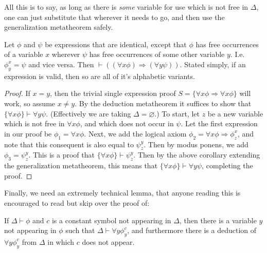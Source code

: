 All this is to say, as long as there is \textit{some} variable for use which is not free in $\Delta$, one can just substitute that wherever it needs to go, and then use the generalization metatheorem safely. 
\begin{lemma}
    Let $\phi$ and $\psi$ be expressions that are identical, except that $\phi$ has free occurrences of a variable $x$ wherever $\psi$ has free occurrences of some other variable $y$. I.e. $\phi_y^x = \psi$ and vice versa. Then $\vdash ((\forall x \phi) \Rightarrow (\forall y \psi))$. Stated simply, if an expression is valid, then so are all of it's alphabetic variants.
\end{lemma}
\begin{proof}
    If $x =y$, then the trivial single expression proof $S = \{\forall x \phi \Rightarrow \forall x \phi\}$ will work, so assume $x \neq y$. By the deduction metatheorem it suffices to show that $\{\forall x \phi \} \vdash \forall y \psi$. (Effectively we are taking $\Delta = \varnothing$.) To start, let $z$ be a new variable which is not free in $\forall x \phi$, and which does not occur in $\psi$. Let the first expression in our proof be $\phi_1 = \forall x \phi$. Next, we add the logical axiom $\phi_2 = \forall x \phi \Rightarrow \phi_z^x$, and note that this consequent is also equal to $\psi_z^y$. Then by modus ponens, we add $\phi_3 = \psi_z^y$. This is a proof that $\{\forall x \phi \} \vdash \psi_z^y$. Then by the above corollary extending the generalization metatheorem, this means that $\{\forall x \phi \} \vdash \forall y \psi$, completing the proof.
\end{proof}
Finally, we need an extremely technical lemma, that anyone reading this is encouraged to read but skip over the proof of:
\begin{fact}
    If $\Delta \vdash \phi$ and $c$ is a constant symbol not appearing in $\Delta$, then there is a variable $y$ not appearing in $\phi$ such that $\Delta \vdash \forall y \phi_y^c$, and furthermore there is a deduction of $\forall y \phi_y^c$ from $\Delta$ in which $c$ does not appear.  
\end{fact}
